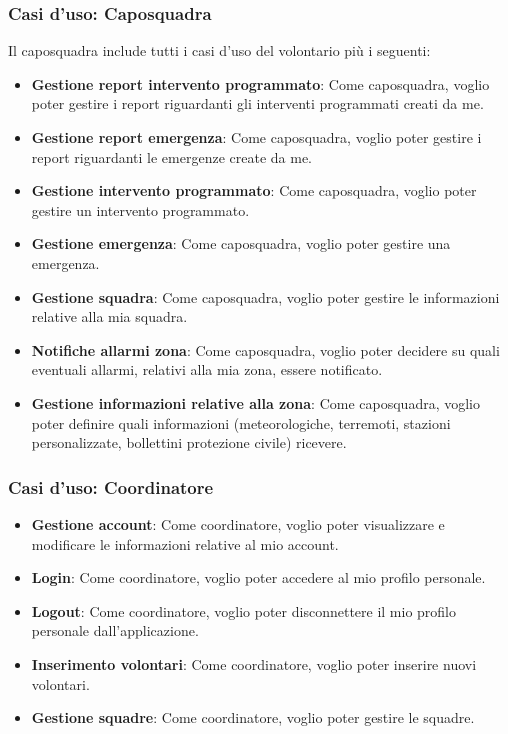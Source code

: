 \subsubsection{Casi d'uso: Caposquadra}
Il caposquadra include tutti i casi d'uso del volontario più i seguenti:
\begin{itemize}
	\item \textbf{Gestione report intervento programmato}:
	Come caposquadra, voglio poter gestire i report riguardanti gli interventi programmati creati da me.
	
	\item \textbf{Gestione report emergenza}:
	Come caposquadra, voglio poter gestire i report riguardanti le emergenze create da me.
	
	\item \textbf{Gestione intervento programmato}:
	Come caposquadra, voglio poter gestire un intervento programmato.
	
	\item \textbf{Gestione emergenza}:
	Come caposquadra, voglio poter gestire una emergenza.
	
	\item \textbf{Gestione squadra}:
	Come caposquadra, voglio poter gestire le informazioni relative alla mia squadra.
	
	\item \textbf{Notifiche allarmi zona}:
	Come caposquadra, voglio poter decidere su quali eventuali allarmi, relativi alla mia zona, essere notificato.
	
	\item \textbf{Gestione informazioni relative alla zona}:
	Come caposquadra, voglio poter definire quali informazioni (meteorologiche, terremoti, stazioni personalizzate, bollettini protezione civile) ricevere.
\end{itemize}




\subsubsection{Casi d'uso: Coordinatore}
\begin{itemize}
	\item \textbf{Gestione account}:
	Come coordinatore, voglio poter visualizzare e modificare le informazioni relative al mio account.
	
	\item \textbf{Login}:
	Come coordinatore, voglio poter accedere al mio profilo personale.
	
	\item \textbf{Logout}:
	Come coordinatore, voglio poter disconnettere il mio profilo personale dall'applicazione.
	
	\item \textbf{Inserimento volontari}:
	Come coordinatore, voglio poter inserire nuovi volontari.
	
	\item \textbf{Gestione squadre}:
	Come coordinatore, voglio poter gestire le squadre.
\end{itemize}


